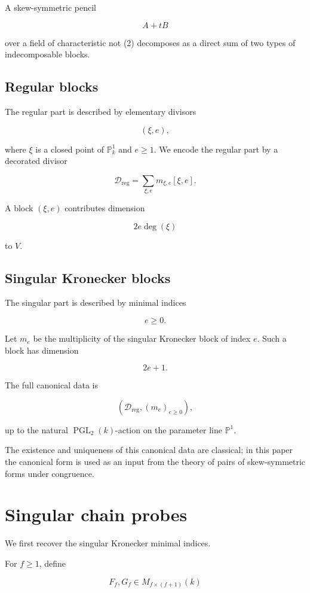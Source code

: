\documentclass[11pt]{article}
\begin{document}
A skew-symmetric pencil

\[
A+tB
\]

over a field of characteristic not (2) decomposes as a direct sum of two types of indecomposable blocks.

\subsection{Regular blocks}

The regular part is described by elementary divisors

\[
(\xi,e),
\]

where $\xi$ is a closed point of $\mathbb P^1_k$ and $e\ge1$. We encode the regular part by a decorated divisor

\[
\mathcal D_{\mathrm{reg}}
=
\sum_{\xi,e}m_{\xi,e}[\xi,e].
\]

A block $(\xi,e)$ contributes dimension

\[
2e\deg(\xi)
\]

to $V$.

\subsection{Singular Kronecker blocks}

The singular part is described by minimal indices

\[
e\ge0.
\]

Let $m_e$ be the multiplicity of the singular Kronecker block of index $e$. Such a block has dimension

\[
2e+1.
\]

The full canonical data is

\[
\left(
\mathcal D_{\mathrm{reg}},
(m_e)_{e\ge0}
\right),
\]

up to the natural $\operatorname{PGL}_2(k)$-action on the parameter line $\mathbb P^1$.

The existence and uniqueness of this canonical data are classical; in this paper the canonical form is used as an input from the theory of pairs of skew-symmetric forms under congruence.

\section{Singular chain probes}

We first recover the singular Kronecker minimal indices.

For $f\ge1$, define

\[
F_f,G_f\in M_{f\times(f+1)}(k)
\]
\end{document}
